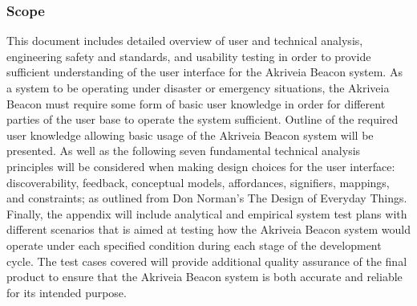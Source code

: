 \subsubsection{Scope}
\medskip
This document includes detailed overview of user and technical analysis, engineering safety and standards, and usability testing in order to provide sufficient understanding of the user interface for the Akriveia Beacon system. As a system to be operating under disaster or emergency situations, the Akriveia Beacon must require some form of basic user knowledge in order for different parties of the user base to operate the system sufficient. Outline of the required user knowledge allowing basic usage of the Akriveia Beacon system will be presented. As well as the following seven fundamental technical analysis principles will be considered when making design choices for the user interface: discoverability, feedback, conceptual models, affordances, signifiers, mappings, and constraints; as outlined from Don Norman's The Design of Everyday Things. Finally, the appendix will include analytical and empirical system test plans with different scenarios that is aimed at testing how the Akriveia Beacon system would operate under each specified condition during each stage of the development cycle. The test cases covered will provide additional quality assurance of the final product to ensure that the Akriveia Beacon system is both accurate and reliable for its intended purpose.






